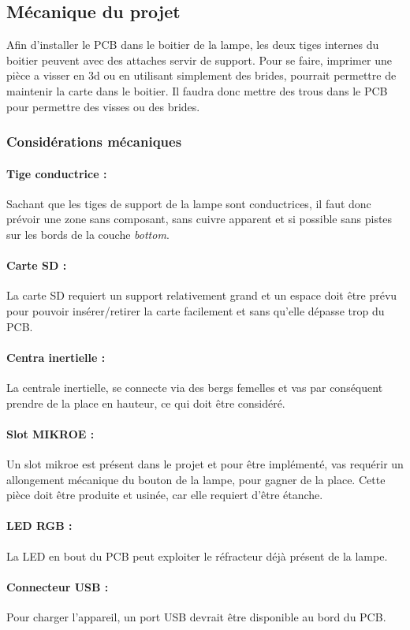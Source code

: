 \subsection{Mécanique du projet} \label{ssec:mechProjet}
{
	Afin d'installer le PCB dans le boitier de la lampe, les deux tiges internes du boitier peuvent avec des attaches servir de support. Pour se faire, imprimer une pièce a visser en 3d ou en utilisant simplement des brides, pourrait permettre de maintenir la carte dans le boitier. Il faudra donc mettre des trous dans le PCB pour permettre des visses ou des brides.
	
	
	\subsubsection{Considérations mécaniques} \label{ssec:RestrictionMech}
	\paragraph{Tige conductrice :} Sachant que les tiges de support de la lampe sont conductrices, il faut donc prévoir une zone sans composant, sans cuivre apparent et si possible sans pistes sur les bords de la couche \textit{bottom}.
	\paragraph{Carte SD : } La carte SD requiert un support relativement grand et un espace doit être prévu pour pouvoir insérer/retirer la carte facilement et sans qu'elle dépasse trop du PCB.
	\paragraph{Centra inertielle :} La centrale inertielle, se connecte via des bergs femelles et vas par conséquent prendre de la place en hauteur, ce qui doit être considéré.
	\paragraph{Slot MIKROE :} Un slot mikroe est présent dans le projet et pour être implémenté, vas requérir un allongement mécanique du bouton de la lampe, pour gagner de la place. Cette pièce doit être produite et usinée, car elle requiert d'être étanche. 
	\paragraph{LED RGB :} La LED en bout du PCB peut exploiter le réfracteur déjà présent de la lampe.
	\paragraph{Connecteur USB :} Pour charger l'appareil, un port USB devrait être disponible au bord du PCB.
}
\clearpage

